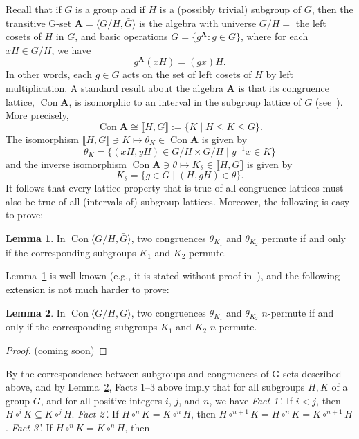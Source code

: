 \documentclass[11pt,reqno]{amsart}
\theoremstyle{plain}
\theoremstyle{definition}
\newtheorem{lemma}{Lemma}
\theoremstyle{remark}
\newcommand{\<}{\ensuremath{\langle}}
\renewcommand{\>}{\ensuremath{\rangle}}
\newcommand{\lb}{\ensuremath{\llbracket}}
\newcommand{\rb}{\ensuremath{\rrbracket}}
\newcommand{\bA}{\ensuremath{\mathbf{A}}}
\renewcommand{\leq}{\ensuremath{\leqslant}}
\newcommand{\Con}{\ensuremath{\operatorname{Con}}}
\newcommand{\circi}{\ensuremath{\circ^{i}}}
\newcommand{\circj}{\ensuremath{\circ^{j}}}
\newcommand{\circn}{\ensuremath{\circ^{n}}}
\begin{document}
Recall that if $G$ is a group and if $H$ is a (possibly trivial) subgroup of $G$, then
the transitive G-set
$\bA = \<G/H, \bar{G}\>$ is the algebra with universe $G/H = $ the left cosets
of $H$ in $G$, and basic operations $\bar{G} = \{g^{\bA} : g\in G\}$, where for
each $xH \in G/H$, we have
\[
g^{\bA}(xH) = (gx)H.
\]
In other words, each $g \in G$ acts on the set of left cosets of $H$ by left
multiplication.
A standard result about the algebra $\bA$ is that its congruence lattice, $\Con
\bA$, is isomorphic to an interval in the subgroup lattice of $G$ 
(see~\cite[Lemma 4.12]{alvi:1987}).  More precisely,
\[
\Con \bA \cong \lb H, G\rb :=\{K \mid H \leq K \leq G\}.
\]
The isomorphism $\lb H, G\rb \ni K \mapsto \theta_K \in \Con \bA$ is given by 
\[
\theta_K = \{(xH, yH)\in G/H \times G/H \mid y^{-1}x \in K \}
\]
and the inverse isomorphism $\Con \bA \ni \theta \mapsto K_\theta \in \lb H,
G\rb$ is given by 
\[
K_\theta = \{ g\in G \mid (H, gH) \in \theta \}.
\]
It follows that every lattice property that is true of all congruence lattices
must also be true of all (intervals of) subgroup lattices.  
Moreover, the following is easy to prove:
\begin{lemma}
\label{lemma:permuting-correspondence}
  In $\Con \<G/H, \bar{G}\>$, two congruences $\theta_{K_1}$ and $\theta_{K_2}$
  permute if and only if the corresponding subgroups $K_1$ and $K_2$ permute.
\end{lemma}
Lemma~\ref{lemma:permuting-correspondence} is well known (e.g., it is stated
without proof in~\cite[Lemma 1]{PalfySaxl}), and the following extension is not
much harder to prove: 
\begin{lemma}
\label{lemma:general-permuting-correspondence}
  In $\Con \<G/H, \bar{G}\>$, two congruences $\theta_{K_1}$ and $\theta_{K_2}$
  $n$-permute if and only if the corresponding subgroups $K_1$ and $K_2$ $n$-permute.
\end{lemma}
\begin{proof}
  (coming soon)
\end{proof}
By the correspondence between subgroups and congruences of G-sets described above, and by
Lemma~\ref{lemma:general-permuting-correspondence}, Facts 1--3 above imply
that for all subgroups $H, K$ of a group $G$, and for all positive integers $i$,
$j$, and $n$, we have
\vskip2mm
\noindent 
{\it Fact 1'.} If $i < j$, then $H \circi K \subseteq K \circj H$.
\vskip2mm
\noindent 
{\it Fact 2'.} If $H \circn K = K \circn H$, then 
$H \circ^{n+1} K =
H \circn K = %
K \circ^{n+1} H$.
\vskip2mm
\noindent 
{\it Fact 3'.} If $H\circn K = K \circn H$, then 
\end{document}
